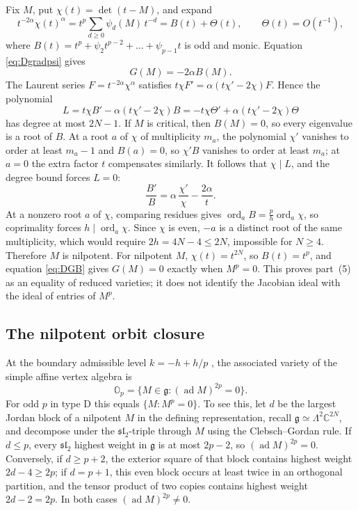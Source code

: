 \documentclass[10pt,reqno]{amsart}
\numberwithin{equation}{section}
\theoremstyle{plain}
\theoremstyle{definition}
\DeclareMathOperator{\ad}{ad}
\begin{document}
Fix $M$, put $\chi(t)=\det(t-M)$, and expand
\begin{equation*}
	t^{-2\alpha}\chi(t)^\alpha=t^p\sum_{d\ge0}\psi_d(M)\,t^{-d}=B(t)+\Theta(t),\qquad \Theta(t)=O(t^{-1}),
\end{equation*}
where $B(t)=t^p+\psi_2t^{p-2}+\dots+\psi_{p-1}t$ is odd and monic. Equation \eqref{eq:Dgradpsi} gives
\begin{equation}\label{eq:DGB}
	G(M)=-2\alpha B(M).
\end{equation}
The Laurent series $F=t^{-2\alpha}\chi^\alpha$ satisfies $t\chi F'=\alpha(t\chi'-2\chi)F$. Hence the polynomial
\begin{equation*}
	L=t\chi B'-\alpha(t\chi'-2\chi)B=-t\chi\Theta'+\alpha(t\chi'-2\chi)\Theta
\end{equation*}
has degree at most $2N-1$. If $M$ is critical, then $B(M)=0$, so every eigenvalue is a root of $B$. At a root $a$ of $\chi$ of multiplicity $m_a$, the polynomial $\chi'$ vanishes to order at least $m_a-1$ and $B(a)=0$, so $\chi'B$ vanishes to order at least $m_a$; at $a=0$ the extra factor $t$ compensates similarly. It follows that $\chi\mid L$, and the degree bound forces $L=0$:
\begin{equation*}
	\frac{B'}B=\alpha\,\frac{\chi'}\chi-\frac{2\alpha}t .
\end{equation*}
At a nonzero root $a$ of $\chi$, comparing residues gives $\operatorname{ord}_aB=\tfrac ph\operatorname{ord}_a\chi$, so coprimality forces $h\mid\operatorname{ord}_a\chi$. Since $\chi$ is even, $-a$ is a distinct root of the same multiplicity, which would require $2h=4N-4\le2N$, impossible for $N\ge4$. Therefore $M$ is nilpotent. For nilpotent $M$, $\chi(t)=t^{2N}$, so $B(t)=t^p$, and equation \eqref{eq:DGB} gives $G(M)=0$ exactly when $M^p=0$. This proves part~(5) as an equality of reduced varieties; it does not identify the Jacobian ideal with the ideal of entries of $M^p$.

\subsection{The nilpotent orbit closure}\label{sec:orbit}

At the boundary admissible level $k=-h+h/p$ \cite{KW88,KWb}, the associated variety of the simple affine vertex algebra is \cite{AvEM}
\begin{equation*}
	\mathbb O_p=\{M\in\mathfrak{g}:(\ad M)^{2p}=0\}.
\end{equation*}
For odd $p$ in type D this equals $\{M:M^p=0\}$. To see this, let $d$ be the largest Jordan block of a nilpotent $M$ in the defining representation, recall $\mathfrak{g}\simeq\Lambda^2\mathbb{C}^{2N}$, and decompose under the $\mathfrak{sl}_2$-triple through $M$ using the Clebsch--Gordan rule. If $d\le p$, every $\mathfrak{sl}_2$ highest weight in $\mathfrak{g}$ is at most $2p-2$, so $(\ad M)^{2p}=0$. Conversely, if $d\ge p+2$, the exterior square of that block contains highest weight $2d-4\ge2p$; if $d=p+1$, this even block occurs at least twice in an orthogonal partition, and the tensor product of two copies contains highest weight $2d-2=2p$. In both cases $(\ad M)^{2p}\neq0$.
\end{document}
